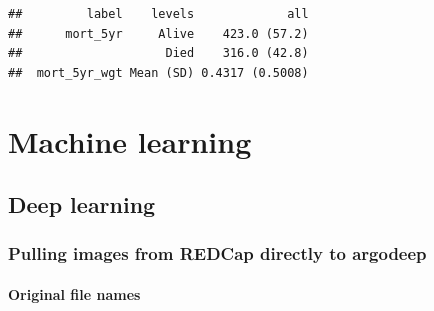 \documentclass[
]{book}
\begin{document}
\begin{verbatim}
##         label    levels             all
##      mort_5yr     Alive    423.0 (57.2)
##                    Died    316.0 (42.8)
##  mort_5yr_wgt Mean (SD) 0.4317 (0.5008)
\end{verbatim}

\hypertarget{machine-learning}{%
\chapter{Machine learning}\label{machine-learning}}

\hypertarget{deep-learning}{%
\section{Deep learning}\label{deep-learning}}

\hypertarget{pulling-images-from-redcap-directly-to-argodeep}{%
\subsection{Pulling images from REDCap directly to argodeep}\label{pulling-images-from-redcap-directly-to-argodeep}}

\hypertarget{original-file-names}{%
\subsubsection{Original file names}\label{original-file-names}}
\end{document}
